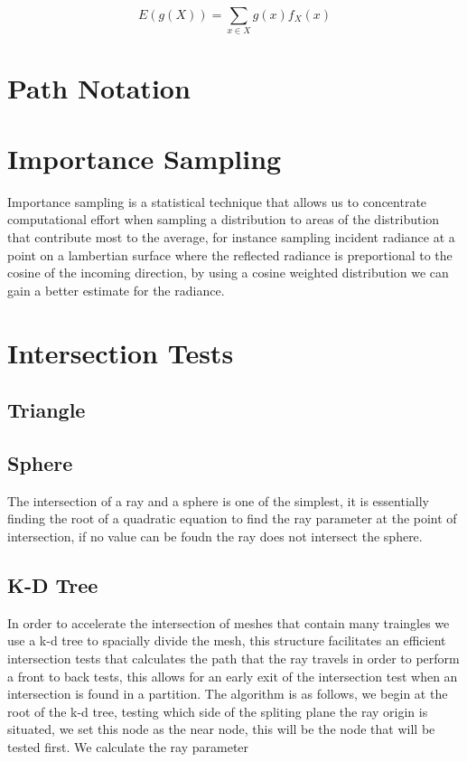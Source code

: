 \begin{equation}
E\left(g\left(X\right)\right) = \sum\limits_{x \in X} g\left(x\right)f_X\left(x\right)
\end{equation}

\section{Path Notation}

\section{Importance Sampling}
Importance sampling is a statistical technique that allows us to concentrate computational effort when sampling a distribution
to areas of the distribution that contribute most to the average, for instance sampling incident radiance at a point on a lambertian
surface where the reflected radiance is preportional to the cosine of the incoming direction, by using a cosine weighted distribution
we can gain a better estimate for the radiance.


\section{Intersection Tests}
\subsection{Triangle}
\subsection{Sphere}
The intersection of a ray and a sphere is one of the simplest, it is essentially finding the root of a quadratic equation to
find the ray parameter at the point of intersection, if no value can be foudn the ray does not intersect the sphere.
\subsection{K-D Tree}
In order to accelerate the intersection of meshes that contain many traingles we use a k-d tree to spacially divide the mesh,
this structure facilitates an efficient intersection tests that calculates the path that the ray travels in order to perform
a front to back tests, this allows for an early exit of the intersection test when an intersection is found in a partition.
The algorithm is as follows, we begin at the root of the k-d tree, testing which side of the spliting plane the ray origin
is situated, we set this node as the near node, this will be the node that will be tested first. We calculate the ray parameter

